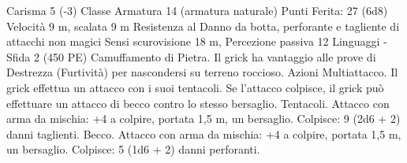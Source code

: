 \begin{multicols}{2}
Carisma 5 (-3)
Classe Armatura 14 (armatura naturale)
\hspace*{0pt}\hfill{Punti Ferita}: 27 (6d8)
Velocità 9 m, scalata 9 m
Resistenza al Danno da botta, perforante e tagliente di
attacchi non magici
Sensi scurovisione 18 m, Percezione passiva 12
Linguaggi -
Sfida 2 (450 PE)
Camuffamento di Pietra. Il grick ha vantaggio alle prove di
Destrezza (Furtività) per nascondersi su terreno roccioso.
Azioni
Multiattacco. Il grick effettua un attacco con i suoi tentacoli. Se
l’attacco colpisce, il grick può effettuare un attacco di becco
contro lo stesso bersaglio.
Tentacoli. Attacco con arma da mischia: +4 a colpire, portata 1,5
m, un bersaglio.
Colpisce: 9 (2d6 + 2) danni taglienti.
Becco. Attacco con arma da mischia: +4 a colpire, portata 1,5 m,
un bersaglio.
Colpisce: 5 (1d6 + 2) danni perforanti.
 

\end{multicols}

